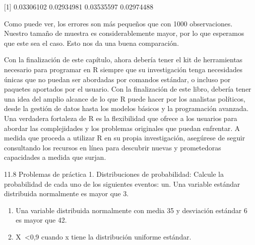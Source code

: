 \documentclass[
]{book}
\begin{document}
{[}1{]} 0.03306102 0.02934981 0.03535597 0.02974488

Como puede ver, los errores son más pequeños que con 1000 observaciones. Nuestro tamaño de muestra es considerablemente mayor, por lo que esperamos que este sea el caso. Esto nos da una buena comparación.

Con la finalización de este capítulo, ahora debería tener el kit de herramientas necesario para programar en R siempre que su investigación tenga necesidades únicas que no puedan ser abordadas por comandos estándar, o incluso por paquetes aportados por el usuario. Con la finalización de este libro, debería tener una idea del amplio alcance de lo que R puede hacer por los analistas políticos, desde la gestión de datos hasta los modelos básicos y la programación avanzada. Una verdadera fortaleza de R es la flexibilidad que ofrece a los usuarios para abordar las complejidades y los problemas originales que puedan enfrentar. A medida que proceda a utilizar R en su propia investigación, asegúrese de seguir consultando los recursos en línea para descubrir nuevas y prometedoras capacidades a medida que surjan.

11.8 Problemas de práctica
1.
Distribuciones de probabilidad: Calcule la probabilidad de cada uno de los siguientes eventos:
un.
Una variable estándar distribuida normalmente es mayor que 3.

\begin{enumerate}
\def\labelenumi{\Alph{enumi}.}
\setcounter{enumi}{1}
\item
  Una variable distribuida normalmente con media 35 y desviación estándar 6 es mayor que 42.
\item
  X  \textless0,9 cuando x tiene la distribución uniforme estándar.
\end{enumerate}
\end{document}
